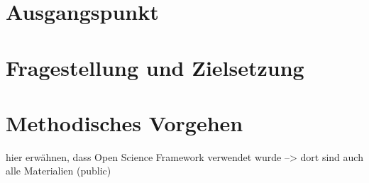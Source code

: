 \onehalfspacing

\section{Ausgangspunkt}

\section{Fragestellung und Zielsetzung}

\section{Methodisches Vorgehen}

hier erwähnen, dass Open Science Framework verwendet wurde --> dort sind auch alle Materialien (public)